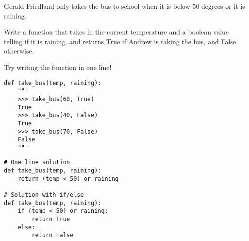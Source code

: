 \begin{blocksection}
\question Gerald Friedland only takes the bus to school when it is below 50 degrees or it is raining.

Write a function that takes in the current temperature and a boolean value telling if it is raining, and returns True if Andrew is taking the bus, and False otherwise.

Try writing the function in one line!

\begin{lstlisting}
def take_bus(temp, raining): 
    """
    >>> take_bus(60, True)
    True
    >>> take_bus(40, False)
    True
    >>> take_bus(70, False)
    False
    """

\end{lstlisting}

\begin{solution}[1.5in]
\begin{lstlisting}
# One line solution
def take_bus(temp, raining):
    return (temp < 50) or raining

# Solution with if/else
def take_bus(temp, raining):
    if (temp < 50) or raining:
    	return True
    else:
    	return False
\end{lstlisting}
\end{solution}
\end{blocksection}
